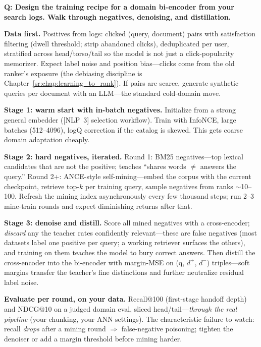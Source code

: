 \begin{interviewq}
\textbf{Q: Design the training recipe for a domain bi-encoder from your search logs. Walk through negatives, denoising, and distillation.}

 \quad {} \quad \badgefreq{\freqmed}

\stronganswer

\textbf{Data first.} Positives from logs: clicked (query, document) pairs with satisfaction filtering (dwell threshold; strip abandoned clicks), deduplicated per user, stratified across head/torso/tail so the model is not just a click-popularity memorizer. Expect label noise and position bias---clicks come from the old ranker's exposure (the debiasing discipline is Chapter~\ref{sr:chap:learning_to_rank}). If pairs are scarce, generate synthetic queries per document with an LLM---the standard cold-domain move.

\textbf{Stage 1: warm start with in-batch negatives.} Initialize from a strong general embedder ([NLP~3] selection workflow). Train with InfoNCE, large batches (512--4096), logQ correction if the catalog is skewed. This gets coarse domain adaptation cheaply.

\textbf{Stage 2: hard negatives, iterated.} Round 1: BM25 negatives---top lexical candidates that are not the positive; teaches ``shares words $\neq$ answers the query.'' Round 2+: ANCE-style self-mining---embed the corpus with the current checkpoint, retrieve top-$k$ per training query, sample negatives from ranks $\sim$10--100. Refresh the mining index asynchronously every few thousand steps; run 2--3 mine-train rounds and expect diminishing returns after that.

\textbf{Stage 3: denoise and distill.} Score all mined negatives with a cross-encoder; \textit{discard} any the teacher rates confidently relevant---these are false negatives (most datasets label one positive per query; a working retriever surfaces the others), and training on them teaches the model to bury correct answers. Then distill the cross-encoder into the bi-encoder with margin-MSE on (q, $d^+$, $d^-$) triples---soft margins transfer the teacher's fine distinctions and further neutralize residual label noise.

\textbf{Evaluate per round, on your data.} Recall@100 (first-stage handoff depth) and NDCG@10 on a judged domain eval, sliced head/tail---\textit{through the real pipeline} (your chunking, your ANN settings). The characteristic failure to watch: recall \textit{drops} after a mining round $\Rightarrow$ false-negative poisoning; tighten the denoiser or add a margin threshold before mining harder.


\end{interviewq}

